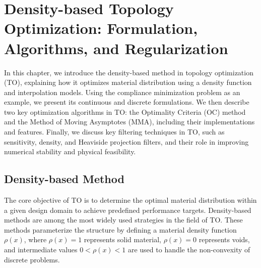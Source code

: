 \documentclass[mathpazo]{cicp}
\begin{document}
\section{Density-based Topology Optimization: Formulation, Algorithms, and Regularization}\label{sec:math}
In this chapter, we introduce the density-based method in topology optimization (TO), explaining how it optimizes material distribution using a density function and interpolation models. Using the compliance minimization problem as an example, we present its continuous and discrete formulations. We then describe two key optimization algorithms in TO: the Optimality Criteria (OC) method and the Method of Moving Asymptotes (MMA), including their implementations and features. Finally, we discuss key filtering techniques in TO, such as sensitivity, density, and Heaviside projection filters, and their role in improving numerical stability and physical feasibility.

\subsection{Density-based Method}\label{sec:DbM}
The core objective of TO is to determine the optimal material distribution within a given design domain to achieve predefined performance targets. Density-based methods are among the most widely used strategies in the field of TO. These methods parameterize the structure by defining a material density function $\rho(x)$, where $\rho(x) = 1$ represents solid material, $\rho(x) = 0$ represents voids, and intermediate values $0 < \rho(x) < 1$ are used to handle the non-convexity of discrete problems.
\end{document}
